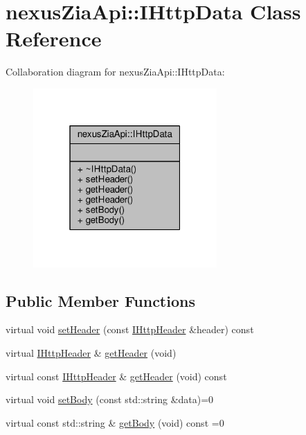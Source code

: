 \hypertarget{classnexusZiaApi_1_1IHttpData}{}\section{nexus\+Zia\+Api\+:\+:I\+Http\+Data Class Reference}
\label{classnexusZiaApi_1_1IHttpData}


Collaboration diagram for nexus\+Zia\+Api\+:\+:I\+Http\+Data\+:\nopagebreak
\begin{figure}[H]
\begin{center}
\leavevmode
\includegraphics[width=199pt]{classnexusZiaApi_1_1IHttpData__coll__graph}
\end{center}
\end{figure}
\subsection*{Public Member Functions}
\begin{DoxyCompactItemize}
\item 
virtual void \hyperlink{classnexusZiaApi_1_1IHttpData_ad53ebfed899c1e965f32501bc63db5c5}{set\+Header} (const \hyperlink{classnexusZiaApi_1_1IHttpHeader}{I\+Http\+Header} \&header) const 
\item 
virtual \hyperlink{classnexusZiaApi_1_1IHttpHeader}{I\+Http\+Header} \& \hyperlink{classnexusZiaApi_1_1IHttpData_a41df45bc96104ac6c03cdbacb6de0bff}{get\+Header} (void)
\item 
virtual const \hyperlink{classnexusZiaApi_1_1IHttpHeader}{I\+Http\+Header} \& \hyperlink{classnexusZiaApi_1_1IHttpData_afce627a46cbc6e85fc0e652ae6814bcd}{get\+Header} (void) const 
\item 
virtual void \hyperlink{classnexusZiaApi_1_1IHttpData_a6f693ebbf8d1e36dc2e05b1c0815c1a7}{set\+Body} (const std\+::string \&data)=0
\item 
virtual const std\+::string \& \hyperlink{classnexusZiaApi_1_1IHttpData_aa591f37edf9e38071e35b2f771eeae1e}{get\+Body} (void) const =0
\end{DoxyCompactItemize}



